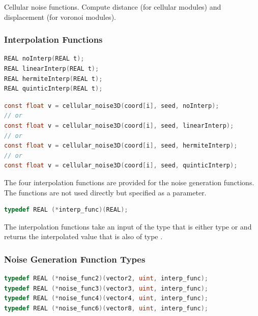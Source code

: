 Cellular noise functions. 
Compute distance (for cellular modules) and displacement (for voronoi modules).

\subsubsection{Interpolation Functions}

\begin{lstlisting}[caption={Definition of interpolation functions},label={lst:interpolation_definition},language=OpenCL]
REAL noInterp(REAL t);
REAL linearInterp(REAL t);
REAL hermiteInterp(REAL t);
REAL quinticInterp(REAL t);
\end{lstlisting}

\begin{lstlisting}[caption={Example for interpolation functions},label={lst:interpolation_example},language=OpenCL]
const float v = cellular_noise3D(coord[i], seed, noInterp);
// or
const float v = cellular_noise3D(coord[i], seed, linearInterp);
// or
const float v = cellular_noise3D(coord[i], seed, hermiteInterp);
// or
const float v = cellular_noise3D(coord[i], seed, quinticInterp);
\end{lstlisting}

The four interpolation functions are provided for the noise generation functions.
The functions are not used directly but specified as a parameter.

\begin{lstlisting}[caption={Definition of interpolation function type},label={lst:interpolation_definition_type},language=OpenCL]
typedef REAL (*interp_func)(REAL);
\end{lstlisting}

The interpolation functions take an input of the type  that
is either type  or  and returns the interpolated value
that is also of type .

\subsubsection{Noise Generation Function Types}

\begin{lstlisting}[caption={Definition of noise generation function types},label={lst:noise_functions_types},language=OpenCL]
typedef REAL (*noise_func2)(vector2, uint, interp_func);
typedef REAL (*noise_func3)(vector3, uint, interp_func);
typedef REAL (*noise_func4)(vector4, uint, interp_func);
typedef REAL (*noise_func6)(vector8, uint, interp_func);
\end{lstlisting}

